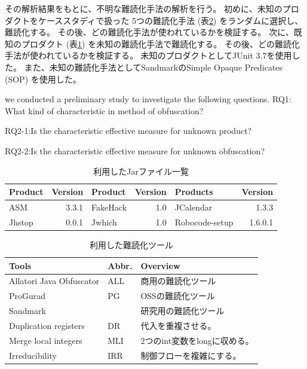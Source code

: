 \documentclass[conference]{IEEEtran}
\begin{document}
その解析結果をもとに、不明な難読化手法の解析を行う。
初めに、未知のプロダクトをケーススタディで扱った
5つの難読化手法 (表\ref{table:tools}) をランダムに選択し、難読化する。
その後、どの難読化手法が使われているかを検証する。
次に、既知のプロダクト (表\ref{table:jars}) を未知の難読化手法で難読化する。
その後、どの難読化手法が使われているかを検証する。
未知のプロダクトとしてJUnit 3.7を使用した。
また、未知の難読化手法としてSandmarkのSimple Opaque Predicates (SOP) を使用した。


we conducted a preliminary study to investigate the following
questions.  RQ1: What kind of characteristic in method of obfuscation?

RQ2-1:Is the characteristic effective measure for unknown product?

RQ2-2:Is the characteristic effective measure for unknown obfuscation?

\begin{table}[t]
  \centering
  \footnotesize{
    \caption{利用したJarファイル一覧}\label{table:jars}
    \begin{tabular}{l|r||l|r||l|r}
    Product & Version & Product & Version & Products & Version \\ \hline
    ASM       & 3.3.1 & FakeHack  & 1.0 &JCalendar & 1.3.3   \\
    Jhstop    & 0.0.1 & Jwhich    & 1.0   & Robocode-setup & 1.6.0.1 
  \end{tabular}}
\end{table}

\begin{table}[t]
  \centering
  \footnotesize{  
    \caption{利用した難読化ツール}\label{table:tools}
    \begin{tabular}{ll|l}
      Tools & Abbr. & Overview \\ \hline
      Allatori Java Obfuscator & ALL & 商用の難読化ツール \\ \hline
      ProGurad                 & PG & OSSの難読化ツール \\ \hline
      Sandmark                 & & 研究用の難読化ツール \\
      \hspace{0.2cm} Duplication registers & DR & 代入を重複させる。\\
      \hspace{0.2cm} Merge local integers & MLI & 2つのint変数をlongに収める。\\
      \hspace{0.2cm} Irreducibility       & IRR & 制御フローを複雑にする。\\
  \end{tabular}}
\end{table}
\end{document}
